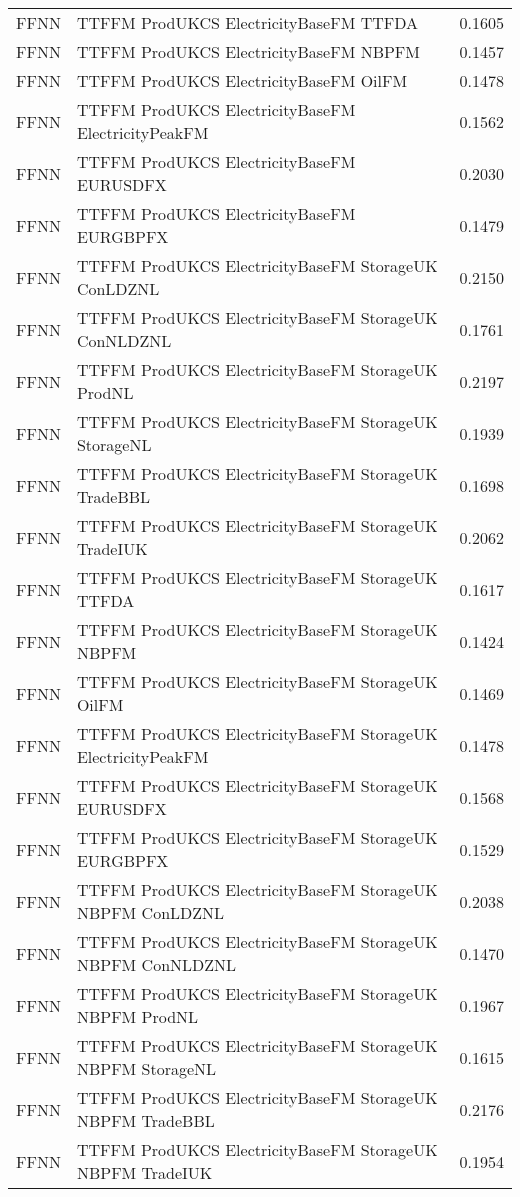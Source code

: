 \begin{table}[h!]
\begin{adjustbox}{max width=\textwidth}
\begin{tabular}{llr}
  FFNN & TTFFM ProdUKCS ElectricityBaseFM TTFDA & 0.1605 \\ 
  FFNN & TTFFM ProdUKCS ElectricityBaseFM NBPFM & 0.1457 \\ 
  FFNN & TTFFM ProdUKCS ElectricityBaseFM OilFM & 0.1478 \\ 
  FFNN & TTFFM ProdUKCS ElectricityBaseFM ElectricityPeakFM & 0.1562 \\ 
  FFNN & TTFFM ProdUKCS ElectricityBaseFM EURUSDFX & 0.2030 \\ 
  FFNN & TTFFM ProdUKCS ElectricityBaseFM EURGBPFX & 0.1479 \\ 
  FFNN & TTFFM ProdUKCS ElectricityBaseFM StorageUK ConLDZNL & 0.2150 \\ 
  FFNN & TTFFM ProdUKCS ElectricityBaseFM StorageUK ConNLDZNL & 0.1761 \\ 
  FFNN & TTFFM ProdUKCS ElectricityBaseFM StorageUK ProdNL & 0.2197 \\ 
  FFNN & TTFFM ProdUKCS ElectricityBaseFM StorageUK StorageNL & 0.1939 \\ 
  FFNN & TTFFM ProdUKCS ElectricityBaseFM StorageUK TradeBBL & 0.1698 \\ 
  FFNN & TTFFM ProdUKCS ElectricityBaseFM StorageUK TradeIUK & 0.2062 \\ 
  FFNN & TTFFM ProdUKCS ElectricityBaseFM StorageUK TTFDA & 0.1617 \\ 
  FFNN & TTFFM ProdUKCS ElectricityBaseFM StorageUK NBPFM & 0.1424 \\ 
  FFNN & TTFFM ProdUKCS ElectricityBaseFM StorageUK OilFM & 0.1469 \\ 
  FFNN & TTFFM ProdUKCS ElectricityBaseFM StorageUK ElectricityPeakFM & 0.1478 \\ 
  FFNN & TTFFM ProdUKCS ElectricityBaseFM StorageUK EURUSDFX & 0.1568 \\ 
  FFNN & TTFFM ProdUKCS ElectricityBaseFM StorageUK EURGBPFX & 0.1529 \\ 
  FFNN & TTFFM ProdUKCS ElectricityBaseFM StorageUK NBPFM ConLDZNL & 0.2038 \\ 
  FFNN & TTFFM ProdUKCS ElectricityBaseFM StorageUK NBPFM ConNLDZNL & 0.1470 \\ 
  FFNN & TTFFM ProdUKCS ElectricityBaseFM StorageUK NBPFM ProdNL & 0.1967 \\ 
  FFNN & TTFFM ProdUKCS ElectricityBaseFM StorageUK NBPFM StorageNL & 0.1615 \\ 
  FFNN & TTFFM ProdUKCS ElectricityBaseFM StorageUK NBPFM TradeBBL & 0.2176 \\ 
  FFNN & TTFFM ProdUKCS ElectricityBaseFM StorageUK NBPFM TradeIUK & 0.1954 \\ 

\end{tabular}
\end{adjustbox}
\end{table}
